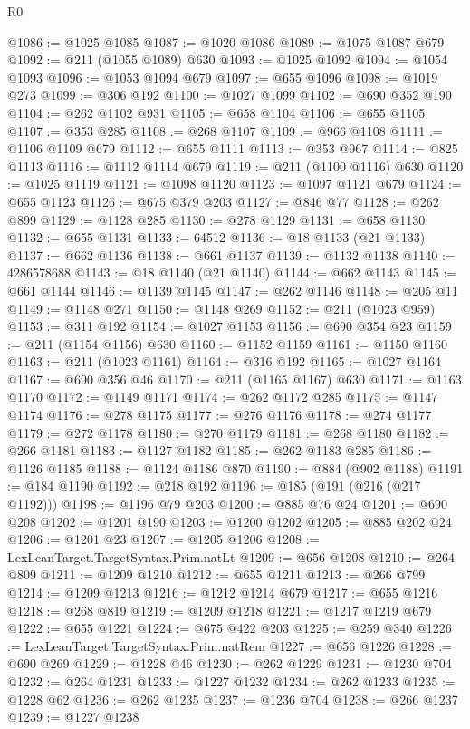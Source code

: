 \begin{lexlean}{R0}
\begin{coremodule}
@1086 := @1025 @1085
@1087 := @1020 @1086
@1089 := @1075 @1087 @679
@1092 := @211 (@1055 @1089) @630
@1093 := @1025 @1092
@1094 := @1054 @1093
@1096 := @1053 @1094 @679
@1097 := @655 @1096
@1098 := @1019 @273
@1099 := @306 @192
@1100 := @1027 @1099
@1102 := @690 @352 @190
@1104 := @262 @1102 @931
@1105 := @658 @1104
@1106 := @655 @1105
@1107 := @353 @285
@1108 := @268 @1107
@1109 := @966 @1108
@1111 := @1106 @1109 @679
@1112 := @655 @1111
@1113 := @353 @967
@1114 := @825 @1113
@1116 := @1112 @1114 @679
@1119 := @211 (@1100 @1116) @630
@1120 := @1025 @1119
@1121 := @1098 @1120
@1123 := @1097 @1121 @679
@1124 := @655 @1123
@1126 := @675 @379 @203
@1127 := @846 @77
@1128 := @262 @899
@1129 := @1128 @285
@1130 := @278 @1129
@1131 := @658 @1130
@1132 := @655 @1131
@1133 := 64512
@1136 := @18 @1133 (@21 @1133)
@1137 := @662 @1136
@1138 := @661 @1137
@1139 := @1132 @1138
@1140 := 4286578688
@1143 := @18 @1140 (@21 @1140)
@1144 := @662 @1143
@1145 := @661 @1144
@1146 := @1139 @1145
@1147 := @262 @1146
@1148 := @205 @11
@1149 := @1148 @271
@1150 := @1148 @269
@1152 := @211 (@1023 @959)
@1153 := @311 @192
@1154 := @1027 @1153
@1156 := @690 @354 @23
@1159 := @211 (@1154 @1156) @630
@1160 := @1152 @1159
@1161 := @1150 @1160
@1163 := @211 (@1023 @1161)
@1164 := @316 @192
@1165 := @1027 @1164
@1167 := @690 @356 @46
@1170 := @211 (@1165 @1167) @630
@1171 := @1163 @1170
@1172 := @1149 @1171
@1174 := @262 @1172 @285
@1175 := @1147 @1174
@1176 := @278 @1175
@1177 := @276 @1176
@1178 := @274 @1177
@1179 := @272 @1178
@1180 := @270 @1179
@1181 := @268 @1180
@1182 := @266 @1181
@1183 := @1127 @1182
@1185 := @262 @1183 @285
@1186 := @1126 @1185
@1188 := @1124 @1186 @870
@1190 := @884 (@902 @1188)
@1191 := @184 @1190
@1192 := @218 @192
@1196 := @185 (@191 (@216 (@217 @1192)))
@1198 := @1196 @79 @203
@1200 := @885 @76 @24
@1201 := @690 @208
@1202 := @1201 @190
@1203 := @1200 @1202
@1205 := @885 @202 @24
@1206 := @1201 @23
@1207 := @1205 @1206
@1208 := LexLeanTarget.TargetSyntax.Prim.natLt
@1209 := @656 @1208
@1210 := @264 @809
@1211 := @1209 @1210
@1212 := @655 @1211
@1213 := @266 @799
@1214 := @1209 @1213
@1216 := @1212 @1214 @679
@1217 := @655 @1216
@1218 := @268 @819
@1219 := @1209 @1218
@1221 := @1217 @1219 @679
@1222 := @655 @1221
@1224 := @675 @422 @203
@1225 := @259 @340
@1226 := LexLeanTarget.TargetSyntax.Prim.natRem
@1227 := @656 @1226
@1228 := @690 @269
@1229 := @1228 @46
@1230 := @262 @1229
@1231 := @1230 @704
@1232 := @264 @1231
@1233 := @1227 @1232
@1234 := @262 @1233
@1235 := @1228 @62
@1236 := @262 @1235
@1237 := @1236 @704
@1238 := @266 @1237
@1239 := @1227 @1238

\end{coremodule}
\end{lexlean}
